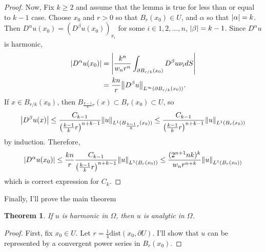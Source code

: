 \documentclass{article}
\newtheorem{theorem}{Theorem}
\begin{document}
\begin{enumerate}
\begin{proof}
Now, Fix $k\geq 2$ and assume that the lemma is true for less than or equal to $k-1$ case. Choose $x_0$ and $r>0$ so that $B_r(x_0)\in U$, and $\alpha$ so that $\abs{\alpha}=k$. Then $D^\alpha u(x_0)=\left(D^\beta u(x_0)\right)_{x_i}$ for some $i\in {1,2,\ldots,n}$, $\abs{\beta}=k-1$. Since $D^\alpha u$ is harmonic,
\begin{equation*}
\begin{split}
\abs{D^\alpha u(x_0)}&=\abs{\frac{k^n}{w_n r^n}\int_{\partial B_{r/k}(x_0)}D^\beta u\nu_i dS}\\
&=\frac{kn}{r}\norm{D^\beta u}_{L^\infty(\partial B_{r/k}(x_0))}.
\end{split}
\end{equation*}
If $x\in B_{r/k}(x_0)$, then $B_{\frac{k-1}{k}r}(x)\subset B_r(x_0)\subset U$, so
\begin{equation*}
\abs{D^\beta u(x)}\leq \frac{C_{k-1}}{\left(\frac{k-1}{k}r\right)^{n+k-1}}\norm{u}_{L^1(B_{\frac{k-1}{k}r}(x_0))}\leq \frac{C_{k-1}}{\left(\frac{k-1}{k}r\right)^{n+k-1}}\norm{u}_{L^1(B_{r}(x_0))}
\end{equation*}
by induction. Therefore,
\begin{equation*}
\abs{D^\alpha u(x_0)}\leq \frac{kn}{r}\frac{C_{k-1}}{\left(\frac{k-1}{k}r\right)^{n+k-1}}\norm{u}_{L^1(B_{r}(x_0))}\leq \frac{(2^{n+1}nk)^k}{w_n r^{n+k}}\norm{u}_{L^1(B_{r}(x_0))}
\end{equation*}
which is correct expression for $C_k$.
\end{proof}

Finally, I'll prove the main theorem
\begin{theorem}
If $u$ is harmonic in $\Omega$, then $u$ is analytic in $\Omega$.
\end{theorem}
\begin{proof}
First, fix $x_0\in U$. Let $r=\frac{1}{4}\textrm{dist}\left(x_0, \partial U\right)$. I'll show that $u$ can be represented by a convergent power series in $B_r(x_0)$.


\end{proof}
\end{enumerate}
\end{document}
